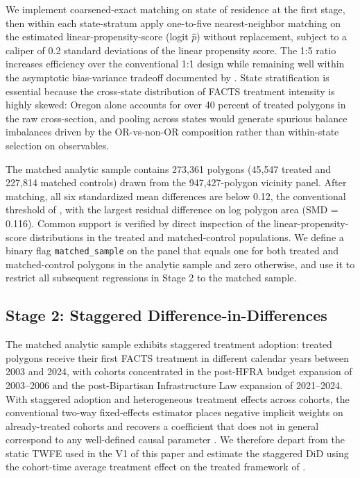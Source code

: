 \documentclass[12pt, letterpaper]{article}
\begin{document}
We implement coarsened-exact matching on state of residence at the first stage, then within each state-stratum apply one-to-five nearest-neighbor matching on the estimated linear-propensity-score (logit $\hat{p}$) without replacement, subject to a caliper of 0.2 standard deviations of the linear propensity score. The 1:5 ratio increases efficiency over the conventional 1:1 design while remaining well within the asymptotic bias-variance tradeoff documented by \citet{rosenbaum1983}. State stratification is essential because the cross-state distribution of FACTS treatment intensity is highly skewed: Oregon alone accounts for over 40 percent of treated polygons in the raw cross-section, and pooling across states would generate spurious balance imbalances driven by the OR-vs-non-OR composition rather than within-state selection on observables.

The matched analytic sample contains 273{,}361 polygons (45{,}547 treated and 227{,}814 matched controls) drawn from the 947{,}427-polygon vicinity panel. After matching, all six standardized mean differences are below 0.12, the conventional threshold of \citet{rosenbaum1983}, with the largest residual difference on log polygon area (SMD = 0.116). Common support is verified by direct inspection of the linear-propensity-score distributions in the treated and matched-control populations. We define a binary flag \texttt{matched\_sample} on the panel that equals one for both treated and matched-control polygons in the analytic sample and zero otherwise, and use it to restrict all subsequent regressions in Stage 2 to the matched sample.

\subsection{Stage 2: Staggered Difference-in-Differences}\label{sec:did}

The matched analytic sample exhibits staggered treatment adoption: treated polygons receive their first FACTS treatment in different calendar years between 2003 and 2024, with cohorts concentrated in the post-HFRA budget expansion of 2003--2006 and the post-Bipartisan Infrastructure Law expansion of 2021--2024. With staggered adoption and heterogeneous treatment effects across cohorts, the conventional two-way fixed-effects estimator places negative implicit weights on already-treated cohorts and recovers a coefficient that does not in general correspond to any well-defined causal parameter \citep{goodmanbacon2021, dechaisemartin2020, sun2021, borusyak2024}. We therefore depart from the static TWFE used in the V1 of this paper and estimate the staggered DiD using the cohort-time average treatment effect on the treated framework of \citet{callaway2021}.
\end{document}
